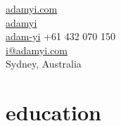 \documentclass[hidelinks__VERSION__]{adamyi-cv}
\begin{document}

{\faGlobe \hspace{0.1em} \href{https://www.adamyi.com}{adamyi.com}\\
\faGithub \hspace{0.1em} \href{https://github.com/adamyi}{adamyi}\\
\faLinkedin \hspace{0.1em} \href{https://linkedin.com/in/adam-yi}{adam-yi}}
{+61 432 070 150\\
\href{mailto:i@adamyi.com}{i@adamyi.com}\\
Sydney, Australia}




\section{education}
\end{document}
